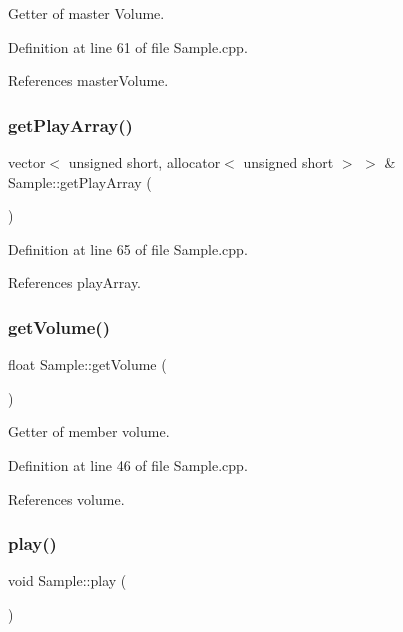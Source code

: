 Getter of master Volume. 



Definition at line 61 of file Sample.\+cpp.



References master\+Volume.

\mbox{\label{class_sample_a5728b28ce6f6ee19a1b84eddded4fa97}} 
\subsubsection{\texorpdfstring{get\+Play\+Array()}{getPlayArray()}}
{\footnotesize\ttfamily vector$<$ unsigned short, allocator$<$ unsigned short $>$ $>$ \& Sample\+::get\+Play\+Array (\begin{DoxyParamCaption}{ }\end{DoxyParamCaption})}



Definition at line 65 of file Sample.\+cpp.



References play\+Array.

\mbox{\label{class_sample_a9f3c251183832a53ec1967331d022575}} 
\subsubsection{\texorpdfstring{get\+Volume()}{getVolume()}}
{\footnotesize\ttfamily float Sample\+::get\+Volume (\begin{DoxyParamCaption}{ }\end{DoxyParamCaption})}



Getter of member volume. 



Definition at line 46 of file Sample.\+cpp.



References volume.

\mbox{\label{class_sample_a2ccc1c5571e54ba6725714cd795698f3}} 
\subsubsection{\texorpdfstring{play()}{play()}}
{\footnotesize\ttfamily void Sample\+::play (\begin{DoxyParamCaption}{ }\end{DoxyParamCaption})}



